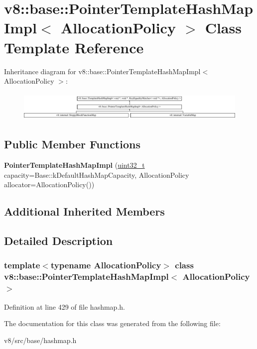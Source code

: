 \hypertarget{classv8_1_1base_1_1PointerTemplateHashMapImpl}{}\section{v8\+:\+:base\+:\+:Pointer\+Template\+Hash\+Map\+Impl$<$ Allocation\+Policy $>$ Class Template Reference}
\label{classv8_1_1base_1_1PointerTemplateHashMapImpl}
Inheritance diagram for v8\+:\+:base\+:\+:Pointer\+Template\+Hash\+Map\+Impl$<$ Allocation\+Policy $>$\+:\begin{figure}[H]
\begin{center}
\leavevmode
\includegraphics[height=1.445783cm]{classv8_1_1base_1_1PointerTemplateHashMapImpl}
\end{center}
\end{figure}
\subsection*{Public Member Functions}
\begin{DoxyCompactItemize}
\item 
\mbox{\label{classv8_1_1base_1_1PointerTemplateHashMapImpl_a22d924c2606aefb9484692d0b2db15b7}} 
{\bfseries Pointer\+Template\+Hash\+Map\+Impl} (\mbox{\hyperlink{classuint32__t}{uint32\+\_\+t}} capacity=Base\+::k\+Default\+Hash\+Map\+Capacity, Allocation\+Policy allocator=Allocation\+Policy())
\end{DoxyCompactItemize}
\subsection*{Additional Inherited Members}


\subsection{Detailed Description}
\subsubsection*{template$<$typename Allocation\+Policy$>$\newline
class v8\+::base\+::\+Pointer\+Template\+Hash\+Map\+Impl$<$ Allocation\+Policy $>$}



Definition at line 429 of file hashmap.\+h.



The documentation for this class was generated from the following file\+:\begin{DoxyCompactItemize}
\item 
v8/src/base/hashmap.\+h\end{DoxyCompactItemize}
